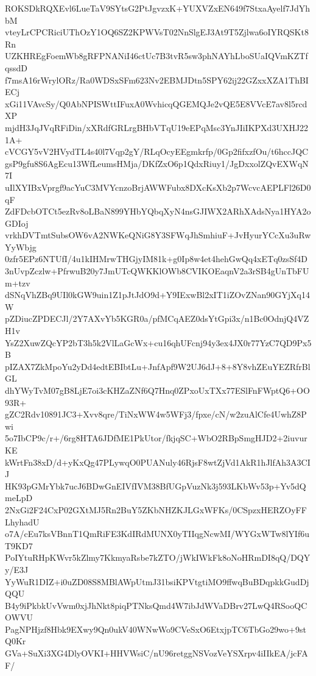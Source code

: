 ROKSDkRQXEvl6LueTaV9SYtsG2PtJgvzxK+YUXVZxEN649f7StxaAyelf7JdYhbM
vteyLrCPCRiciUThOzY1OQ6SZ2KPWVsT02NnSlgEJ3At9T5Zjlwa6oIYRQSKt8Rn
UZKHREgFoemWb8gRFPNANiI46ctUc7B3tvR5sw3phNAYhLboSUaIQVmKZTfqssdD
f7msA16rWrylORz/Ra0WDSxSFm623Nv2EBMJDtn5SPY62ij22GZxxXZA1ThBIECj
xGi11VAvcSy/Q0AbNPISWttIFuxA0WvhicqQGEMQJe2vQE5E8VVcE7av8l5rcdXP
mjdH3JqJVqRFiDin/xXRdfGRLrgBHbVTqU19eEPqMsc3YnJIiIKPXd3UXHJ221A+
cVCGY5vV2HVydTL4s40l7Vqp2gY/RLqOcyEEgmkrfp/0Gp2fifxzfOu/t6hccJQC
gsP9gfu8S6AgEcu13WfLeumsHMja/DKfZxO6p1QdxRiuy1/JgDxxolZQvEXWqN7I
uIlXYIBxVprgf9acYuC3MVYcnzoBrjAWWFubx8DXcKsXb2p7WcvcAEPLFl26D0qF
ZdFDcbOTCt5ezRv8oLBaN899YHbYQbqXyN4nsGJIWX2ARhXAdsNya1HYA2oGDIoj
vrkhDVTmtSubsOW6vA2NWKeQNiG8Y3SFWqJhSmhiuF+JvHyurYCcXu3uRwYyWbjg
0zfr5EPz6NTUfI/4u1kIHMrwTHGjyIM81k+g0Ip8w4et4hehGwQq4xETq0zsSf4D
3nUvpZczlw+PfrwuB20y7JmUTcQWKKlOWb8CVIKOEaqnV2a3rSB4gUnTbFUm+tzv
dSNqVhZBq9UIl0kGW9uin1Z1pJtJdO9d+Y9IExwBl2xIT1iZOvZNan90GYjXq14W
pZDiucZPDECJl/2Y7AXvYb5KGR0a/pfMCqAEZ0dsYtGpi3x/n1Bc0OdnjQ4VZH1v
YsZ2XuwZQcYP2bT3h5k2VlLaGcWx+cu16qhUFcnj94y3ex4JX0r77YzC7QD9Px5B
pIZAX7ZkMpoYu2yDd4edtEBIbtLu+JnfApf9W2UJ6dJ+8+8Y8vhZEuYEZRfrBlGL
dhYWyTvM07gB8LjE7oi3cKHZaZNf6Q7Hnq0ZPxoUxTXx77ESlFnFWptQ6+OO93R+
gZC2Rdv10891JC3+Xvv8qre/TiNxWW4w5WFj3/fpxe/cN/w2zuAlCfe4UwhZ8Pwi
5o7IbCP9c/r+/6rg8HTA6JDfME1PkUtor/fkjqSC+WbO2RBpSmgHJD2+2iuvurKE
kWrtFn38xD/d+yKxQg47PLywqO0PUANuly46RjsF8wtZjVd1AkR1hJlfAh3A3CIJ
HK93pGMrYbk7ucJ6BDwGnEIVfIVM38BfUGpVuzNk3j593LKbWv53p+Yv5dQmeLpD
2NxGi2F24CxP02GXtMJ5Rn2BuY5ZKbNHZKJLGxWFKs/0CSpzxHERZOyFFLhyhadU
o7A/cEu7ksVBnnT1QmRiFE3KdIRdMUNX0yTIIqgNcwMI/WYGxWTw8lYIf6uT9KD7
PoIYtuRHpKWvr5kZlmy7KkmyaRsbe7kZTO/jWkIWkFk8oNoHRmDI8qQ/DQYy/E3J
YyWuR1DIZ+i0uZD08S8MBlAWpUtmJ31bsiKPVtgtiMO9ffwqBuBDqpkkGudDjQQU
B4y9iPkbkUvVwm0xjJhNkt8piqPTNksQmd4W7ibJdWVaDBrv27LwQ4RSooQCOWVU
PagNPHjzf8Hbk9EXwy9Qn0ukV40WNwWo9CVeSxO6EtxjpTC6TbGo29wo+9stQ0Kr
GVa+SuXi3XG4DlyOVKI+HHVWsiC/nU96retggNSVozVeYSXrpv4iIIkEA/jcFAF/
